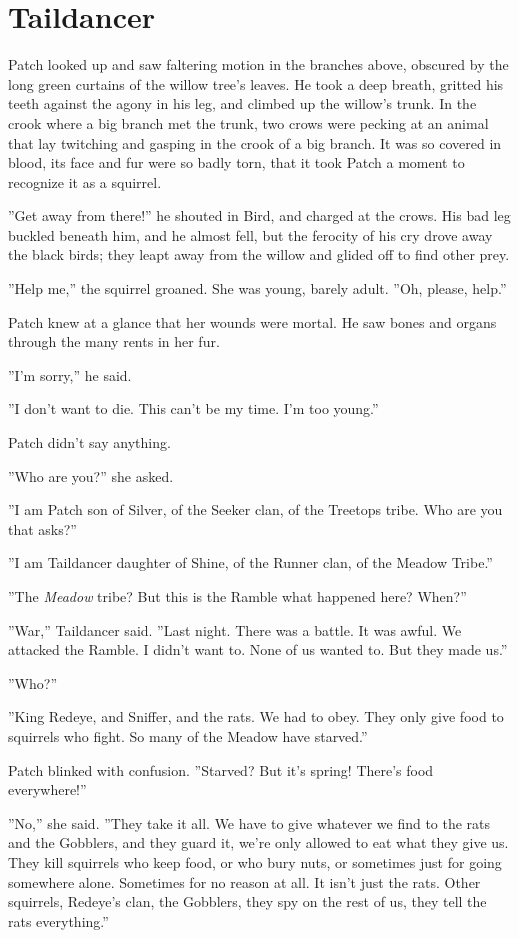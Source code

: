 \documentclass[12pt]{book}
\begin{document}

\section{Taildancer}

Patch looked up and saw faltering motion in the branches above, obscured by the long green curtains of the willow tree's leaves. He took a deep breath, gritted his teeth against the agony in his leg, and climbed up the willow's trunk. In the crook where a big branch met the trunk, two crows were pecking at an animal that lay twitching and gasping in the crook of a big branch. It was so covered in blood, its face and fur were so badly torn, that it took Patch a moment to recognize it as a squirrel.

''Get away from there!'' he shouted in Bird, and charged at the crows. His bad leg buckled beneath him, and he almost fell, but the ferocity of his cry drove away the black birds; they leapt away from the willow and glided off to find other prey.

''Help me,'' the squirrel groaned. She was young, barely adult. ''Oh, please, help.''

Patch knew at a glance that her wounds were mortal. He saw bones and organs through the many rents in her fur.

''I'm sorry,'' he said.

''I don't want to die. This can't be my time. I'm too young.''

Patch didn't say anything.

''Who are you?'' she asked.

''I am Patch son of Silver, of the Seeker clan, of the Treetops tribe. Who are you that asks?''

''I am Taildancer daughter of Shine, of the Runner clan, of the Meadow Tribe.''

''The {\it Meadow} tribe? But this is the Ramble %
what happened here? When?''

''War,'' Taildancer said. ''Last night. There was a battle. It was awful. We attacked the Ramble. I didn't want to. None of us wanted to. But they made us.''

''Who?''

''King Redeye, and Sniffer, and the rats. We had to obey. They only give food to squirrels who fight. So many of the Meadow have starved.''

Patch blinked with confusion. ''Starved? But it's spring! There's food everywhere!''

''No,'' she said. ''They take it all. We have to give whatever we find to the rats and the Gobblers, and they guard it, we're only allowed to eat what they give us. They kill squirrels who keep food, or who bury nuts, or sometimes just for going somewhere alone. Sometimes for no reason at all. It isn't just the rats. Other squirrels, Redeye's clan, the Gobblers, they spy on the rest of us, they tell the rats everything.''
\end{document}
